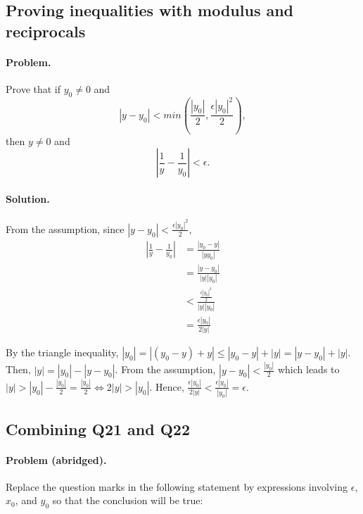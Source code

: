 \documentclass{article}
\begin{document}
\setcounter{subsection}{21}
\subsection{Proving inequalities with modulus and reciprocals}

\paragraph{Problem.} Prove that if $y_0 \neq 0$ and \begin{equation*}
  |y - y_0| < min\left(\frac{|y_0|}{2}, \frac{\epsilon|y_0|^2}{2}\right),
\end{equation*} then $y \neq 0$ and \begin{equation*}
  \left|\frac{1}{y} - \frac{1}{y_0}\right| < \epsilon.
\end{equation*}

\paragraph{Solution.} From the assumption, since $|y - y_0| < \frac{\epsilon|y_0|^2}{2}$, \begin{align*}
  \left|\frac{1}{y} - \frac{1}{y_0}\right| &= \frac{|y_0 - y|}{|yy_0|} \\
                                           &= \frac{|y - y_0|}{|y||y_0|} \\
                                           &< \frac{\frac{\epsilon|y_0|^2}{2}}{|y||y_0|} \\
                                           &= \frac{\epsilon|y_0|}{2|y|}
\end{align*}

By the triangle inequality, $|y_0| = |(y_0 - y) + y| \leq |y_0 - y| + |y| = |y - y_0| + |y|$. Then, $|y| = |y_0| - |y - y_0|$. From the assumption, $|y - y_0| < \frac{|y_0|}{2}$ which leads to $|y| > |y_0| - \frac{|y_0|}{2} = \frac{|y_0|}{2} \iff 2|y| > |y_0|$. Hence, $\frac{\epsilon|y_0|}{2|y|} < \frac{\epsilon|y_0|}{|y_0|} = \epsilon$.

\setcounter{subsection}{22}
\subsection{Combining Q21 and Q22}

\paragraph{Problem (abridged).} Replace the question marks in the following statement by expressions involving $\epsilon$, $x_0$, and $y_0$ so that the conclusion will be true:
\end{document}
